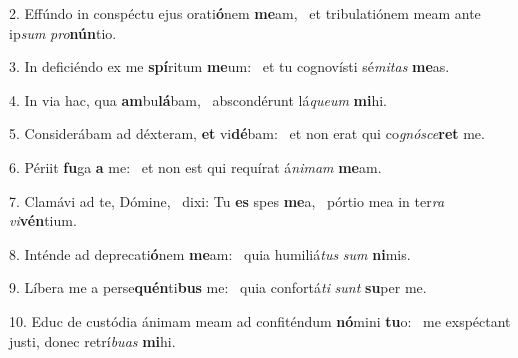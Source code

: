 2. Effúndo in conspéctu ejus orati\textbf{ó}nem \textbf{me}am, \ast\  et tribulatiónem meam ante ip\textit{sum} \textit{pro}\textbf{nún}tio.\

3. In deficiéndo ex me \textbf{spí}ritum \textbf{me}um: \ast\  et tu cognovísti sé\textit{mi}\textit{tas} \textbf{me}as.\

4. In via hac, qua \textbf{am}bu\textbf{lá}bam, \ast\  abscondérunt lá\textit{que}\textit{um} \textbf{mi}hi.\

5. Considerábam ad déxteram, \textbf{et} vi\textbf{dé}bam: \ast\  et non erat qui co\textit{gnó}\textit{sce}\textbf{ret} me.\

6. Périit \textbf{fu}ga \textbf{a} me: \ast\  et non est qui requírat á\textit{ni}\textit{mam} \textbf{me}am.\

7. Clamávi ad te, Dómine, \dag\  dixi: Tu \textbf{es} spes \textbf{me}a, \ast\  pórtio mea in ter\textit{ra} \textit{vi}\textbf{vén}tium.\

8. Inténde ad deprecati\textbf{ó}nem \textbf{me}am: \ast\  quia humiliá\textit{tus} \textit{sum} \textbf{ni}mis.\

9. Líbera me a perse\textbf{quén}ti\textbf{bus} me: \ast\  quia confortá\textit{ti} \textit{sunt} \textbf{su}per me.\

10. Educ de custódia ánimam meam ad confiténdum \textbf{nó}mini \textbf{tu}o: \ast\  me exspéctant justi, donec retrí\textit{bu}\textit{as} \textbf{mi}hi.\

